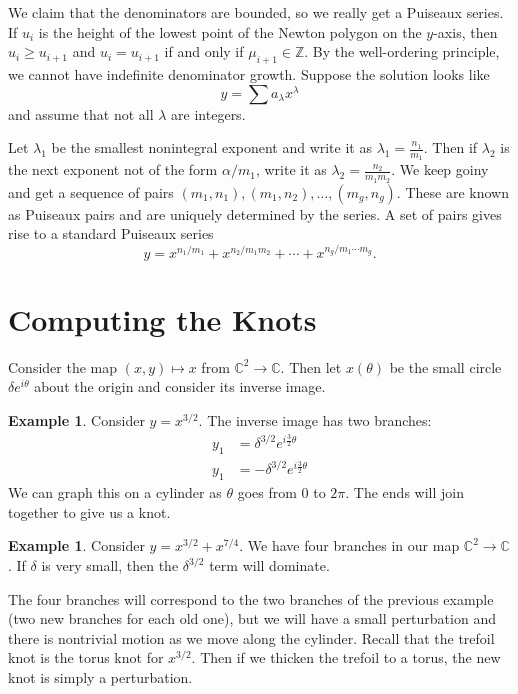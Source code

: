 \documentclass[leqno, openany]{memoir}
\theoremstyle{definition}
\newtheorem{exm}[thm]{Example}
\theoremstyle{remark}
\theoremstyle{plain}
\theoremstyle{definition}
\theoremstyle{remark}
\newcommand{\C}{\mathbb{C}}
\newcommand{\Z}{\mathbb{Z}}
\begin{document}
We claim that the denominators are bounded, so we really get a Puiseaux series.
If $u_i$ is the height of the lowest point of the Newton polygon on the
$y$-axis, then $u_i \geq u_{i+1}$ and $u_i = u_{i+1}$ if and only if $\mu_{i+1}
\in \Z$. By the well-ordering principle, we cannot have indefinite denominator
growth. Suppose the solution looks like \[ y = \sum a_{\lambda} x^{\lambda} \]
and assume that not all $\lambda$ are integers. 

Let $\lambda_1$ be the smallest nonintegral exponent and write it as $\lambda_1
= \frac{n_1}{m_1}$. Then if $\lambda_2$ is the next exponent not of the form
$\alpha/m_1$, write it as $\lambda_2 = \frac{n_2}{m_1m_2}$. We keep goiny and
get a sequence of pairs $(m_1, n_1), (m_1, n_2), \ldots, (m_g, n_g)$. These are
known as Puiseaux pairs and are uniquely determined by the series. A set of
pairs gives rise to a standard Puiseaux series \[ y = x^{n_1/m_1} +
x^{n_2/m_1m_2} + \cdots + x^{n_g/m_1\cdots m_g}. \]

\section{Computing the Knots}%


Consider the map $(x,y) \mapsto x$ from $\C^2 \to \C$. Then let $x(\theta)$ be
the small circle $\delta e^{i\theta}$ about the origin and consider its inverse
image.

\begin{exm} Consider $y = x^{3/2}$. The inverse image has two branches:
    \begin{align*} y_1 &= \delta^{3/2}e^{i\frac{3}{2} \theta} \\ y_1 &= -
    \delta^{3/2}e^{i\frac{3}{2} \theta} \end{align*} We can graph this on a
    cylinder as $\theta$ goes from $0$ to $2\pi$. The ends will join together
    to give us a knot.  \end{exm}

\begin{exm} Consider $y = x^{3/2} + x^{7/4}$. We have four branches in our map
    $\C^2 \to \C$. If $\delta$ is very small, then the $\delta^{3/2}$ term will
    dominate.

    The four branches will correspond to the two branches of the previous
example (two new branches for each old one), but we will have a small
perturbation and there is nontrivial motion as we move along the cylinder.
Recall that the trefoil knot is the torus knot for $x^{3/2}$. Then if we
thicken the trefoil to a torus, the new knot is simply a perturbation.
\end{exm}
\end{document}
